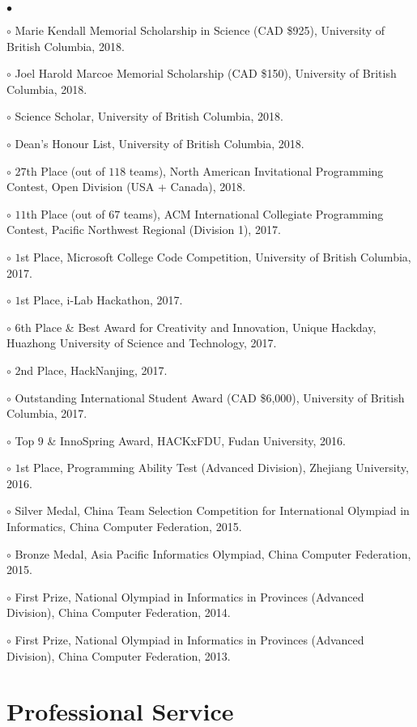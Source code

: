 \documentclass[margin,line]{res}
\newenvironment{list2}{
  \begin{list}{$\bullet$}{%
      \setlength{\itemsep}{0in}
      \setlength{\parsep}{0in} \setlength{\parskip}{0in}
      \setlength{\topsep}{0in} \setlength{\partopsep}{0in}
      \setlength{\leftmargin}{0.2in}}}{\end{list}}
\begin{document}
\begin{resume}
\begin{list2}
\item[$\circ$] Marie Kendall Memorial Scholarship in Science (CAD \$925), University of British Columbia, 2018.
\item[$\circ$] Joel Harold Marcoe Memorial Scholarship (CAD \$150), University of British Columbia, 2018.
\item[$\circ$] Science Scholar, University of British Columbia, 2018.
\item[$\circ$] Dean's Honour List, University of British Columbia, 2018.
\item[$\circ$] $27$th Place (out of $118$ teams), North American Invitational Programming Contest, Open Division (USA + Canada), 2018.
\item[$\circ$] $11$th Place (out of $67$ teams), ACM International Collegiate Programming Contest, Pacific Northwest Regional (Division 1), 2017.
\item[$\circ$] $1$st Place, Microsoft College Code Competition, University of British Columbia, 2017.
\item[$\circ$] $1$st Place, i-Lab Hackathon, 2017.
\item[$\circ$] $6$th Place \& Best Award for Creativity and Innovation, Unique Hackday, Huazhong University of Science and Technology, 2017.
\item[$\circ$] $2$nd Place, HackNanjing, 2017.
\item[$\circ$] Outstanding International Student Award (CAD \$6,000), University of British Columbia, 2017.
\item[$\circ$] Top $9$ \& InnoSpring Award, HACKxFDU, Fudan University, 2016.
\item[$\circ$] $1$st Place, Programming Ability Test (Advanced Division), Zhejiang University, 2016.
\item[$\circ$] Silver Medal, China Team Selection Competition for International Olympiad in Informatics, China Computer Federation, 2015.
\item[$\circ$] Bronze Medal, Asia Pacific Informatics Olympiad, China Computer Federation, 2015.
\item[$\circ$] First Prize, National Olympiad in Informatics in Provinces (Advanced Division), China Computer Federation, 2014.
\item[$\circ$] First Prize, National Olympiad in Informatics in Provinces (Advanced Division), China Computer Federation, 2013.
\end{list2}


\section{\sc Professional Service}


\end{resume}
\end{document}
